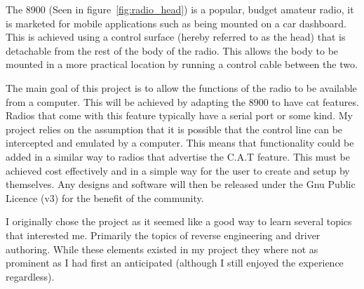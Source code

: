 The \gls{8900} (Seen in figure~\ref{fig:radio_head}) is a popular, budget amateur radio, it is marketed for mobile applications such as being mounted on a car dashboard. This is achieved using a control surface (hereby referred to as the head) that is detachable from the rest of the body of the radio. This allows the body to be mounted in a more practical location by running a control cable between the two.

The main goal of this project is to allow the functions of the radio to be available from a computer. This will be achieved by adapting the \gls{8900} to have \gls{cat} features. Radios that come with this feature typically have a serial port or some kind. My project relies on the assumption that it is possible that the control line can be intercepted and emulated by a computer. This means that functionality could be added in a similar way to radios that advertise the C.A.T feature. This must be achieved cost effectively and in a simple way for the user to create and setup by themselves. Any designs and software will then be released under the Gnu Public Licence (v3) for the benefit of the community.

I originally chose the project as it seemed like a good way to learn several topics that interested me. Primarily the topics of reverse engineering and driver authoring. While these elements existed in my project they where not as prominent as I had first an anticipated (although I still enjoyed the experience regardless). 